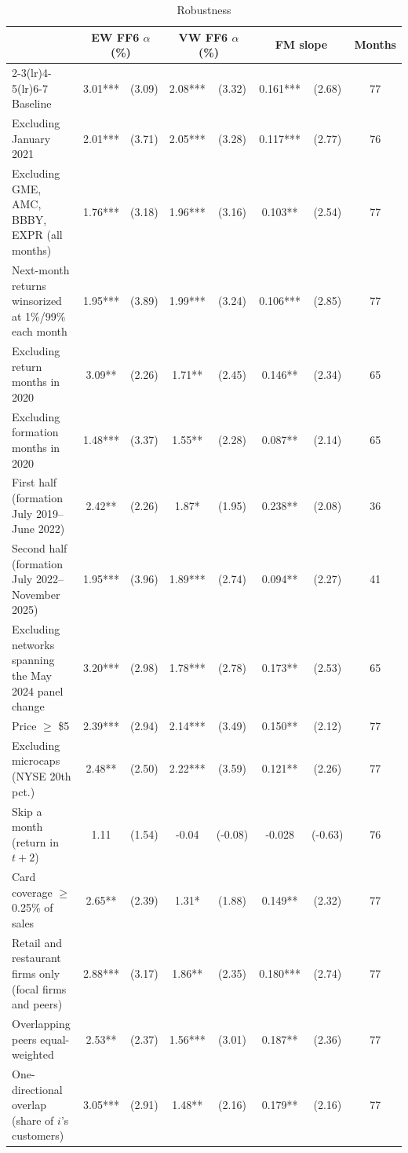 \begin{table}[!htbp]\centering
\caption{Robustness}\label{tab:robust}
\scriptsize
\begin{tabular*}{\linewidth}{@{\extracolsep{\fill}}lccccccc}
\toprule
 & \multicolumn{2}{c}{EW FF6 $\alpha$ (\%)} & \multicolumn{2}{c}{VW FF6 $\alpha$ (\%)} & \multicolumn{2}{c}{FM slope} & Months \\
\cmidrule(lr){2-3}\cmidrule(lr){4-5}\cmidrule(lr){6-7}
\midrule
Baseline & 3.01*** & (3.09) & 2.08*** & (3.32) & 0.161*** & (2.68) & 77 \\
Excluding January 2021 & 2.01*** & (3.71) & 2.05*** & (3.28) & 0.117*** & (2.77) & 76 \\
Excluding GME, AMC, BBBY, EXPR (all months) & 1.76*** & (3.18) & 1.96*** & (3.16) & 0.103** & (2.54) & 77 \\
Next-month returns winsorized at 1\%/99\% each month & 1.95*** & (3.89) & 1.99*** & (3.24) & 0.106*** & (2.85) & 77 \\
Excluding return months in 2020 & 3.09** & (2.26) & 1.71** & (2.45) & 0.146** & (2.34) & 65 \\
Excluding formation months in 2020 & 1.48*** & (3.37) & 1.55** & (2.28) & 0.087** & (2.14) & 65 \\
First half (formation July 2019--June 2022) & 2.42** & (2.26) & 1.87* & (1.95) & 0.238** & (2.08) & 36 \\
Second half (formation July 2022--November 2025) & 1.95*** & (3.96) & 1.89*** & (2.74) & 0.094** & (2.27) & 41 \\
Excluding networks spanning the May 2024 panel change & 3.20*** & (2.98) & 1.78*** & (2.78) & 0.173** & (2.53) & 65 \\
Price $\geq$ \$5 & 2.39*** & (2.94) & 2.14*** & (3.49) & 0.150** & (2.12) & 77 \\
Excluding microcaps (NYSE 20th pct.) & 2.48** & (2.50) & 2.22*** & (3.59) & 0.121** & (2.26) & 77 \\
Skip a month (return in $t+2$) & 1.11 & (1.54) & -0.04 & (-0.08) & -0.028 & (-0.63) & 76 \\
Card coverage $\geq$ 0.25\% of sales & 2.65** & (2.39) & 1.31* & (1.88) & 0.149** & (2.32) & 77 \\
Retail and restaurant firms only (focal firms and peers) & 2.88*** & (3.17) & 1.86** & (2.35) & 0.180*** & (2.74) & 77 \\
Overlapping peers equal-weighted & 2.53** & (2.37) & 1.56*** & (3.01) & 0.187** & (2.36) & 77 \\
One-directional overlap (share of $i$'s customers) & 3.05*** & (2.91) & 1.48** & (2.16) & 0.179** & (2.16) & 77 \\

\end{tabular*}
\end{table}
